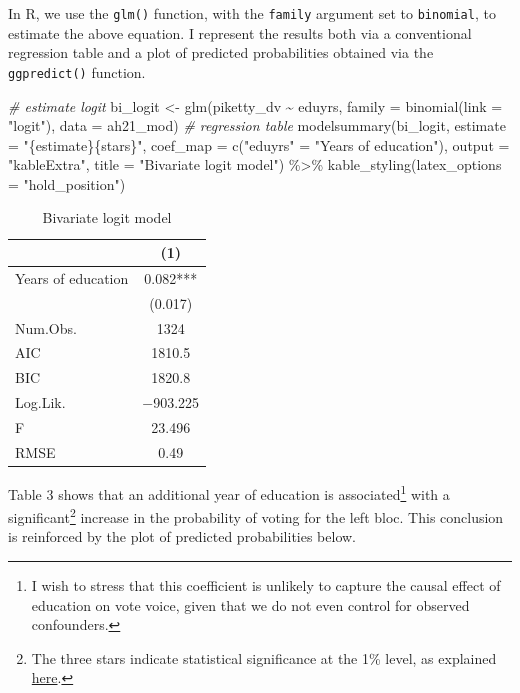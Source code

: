 \documentclass[
]{article}
\newenvironment{Shaded}{\begin{snugshade}}{\end{snugshade}}
\newcommand{\AttributeTok}[1]{\textcolor[rgb]{0.77,0.63,0.00}{#1}}
\newcommand{\CommentTok}[1]{\textcolor[rgb]{0.56,0.35,0.01}{\textit{#1}}}
\newcommand{\FunctionTok}[1]{\textcolor[rgb]{0.00,0.00,0.00}{#1}}
\newcommand{\NormalTok}[1]{#1}
\newcommand{\OtherTok}[1]{\textcolor[rgb]{0.56,0.35,0.01}{#1}}
\newcommand{\SpecialCharTok}[1]{\textcolor[rgb]{0.00,0.00,0.00}{#1}}
\newcommand{\StringTok}[1]{\textcolor[rgb]{0.31,0.60,0.02}{#1}}
\begin{document}
In R, we use the \texttt{glm()} function, with the \texttt{family}
argument set to \texttt{binomial}, to estimate the above equation. I
represent the results both via a conventional regression table and a
plot of predicted probabilities obtained via the \texttt{ggpredict()}
function.

\begin{Shaded}
\begin{Highlighting}[]
\CommentTok{\# estimate logit}
\NormalTok{bi\_logit }\OtherTok{\textless{}{-}} \FunctionTok{glm}\NormalTok{(piketty\_dv }\SpecialCharTok{\textasciitilde{}}\NormalTok{ eduyrs, }
                \AttributeTok{family =} \FunctionTok{binomial}\NormalTok{(}\AttributeTok{link =} \StringTok{"logit"}\NormalTok{),}
                \AttributeTok{data =}\NormalTok{ ah21\_mod)}
\CommentTok{\# regression table}
\FunctionTok{modelsummary}\NormalTok{(bi\_logit,}
             \AttributeTok{estimate =} \StringTok{"\{estimate\}\{stars\}"}\NormalTok{, }
             \AttributeTok{coef\_map =} \FunctionTok{c}\NormalTok{(}\StringTok{"eduyrs"} \OtherTok{=} \StringTok{"Years of education"}\NormalTok{),}
             \AttributeTok{output =} \StringTok{"kableExtra"}\NormalTok{,}
             \AttributeTok{title =} \StringTok{"Bivariate logit model"}\NormalTok{) }\SpecialCharTok{\%\textgreater{}\%}
  \FunctionTok{kable\_styling}\NormalTok{(}\AttributeTok{latex\_options =} \StringTok{"hold\_position"}\NormalTok{)}
\end{Highlighting}
\end{Shaded}

\begin{table}[!h]

\caption{\label{tab:bi-logit-table}Bivariate logit model}
\centering
\begin{tabular}[t]{lc}
\toprule
  & (1)\\
\midrule
Years of education & \num{0.082}***\\
 & (\num{0.017})\\
\midrule
Num.Obs. & \num{1324}\\
AIC & \num{1810.5}\\
BIC & \num{1820.8}\\
Log.Lik. & \num{-903.225}\\
F & \num{23.496}\\
RMSE & \num{0.49}\\
\bottomrule
\end{tabular}
\end{table}

Table 3 shows that an additional year of education is
associated\footnote{I wish to stress that this coefficient is unlikely
  to capture the causal effect of education on vote voice, given that we
  do not even control for observed confounders.} with a
significant\footnote{The three stars indicate statistical significance
  at the 1\% level, as explained
  \href{https://vincentarelbundock.github.io/modelsummary/articles/modelsummary.html}{here}.}
increase in the probability of voting for the left bloc. This conclusion
is reinforced by the plot of predicted probabilities below.
\end{document}
